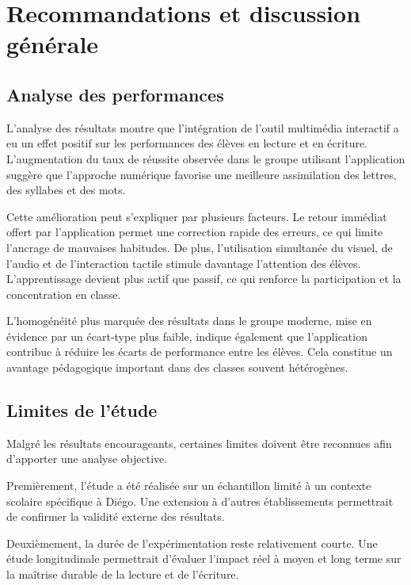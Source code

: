 \documentclass[a4paper,oneside,12pt]{book}
\begin{document}
  








\chapter{Recommandations et discussion générale}\label{chap2}








\section{Analyse des performances}
L'analyse des résultats montre que l'intégration de l'outil multimédia interactif a eu un effet positif sur les performances des élèves en lecture et en écriture. L'augmentation du taux de réussite observée dans le groupe utilisant l'application suggère que l'approche numérique favorise une meilleure assimilation des lettres, des syllabes et des mots.

Cette amélioration peut s'expliquer par plusieurs facteurs. Le retour immédiat offert par l'application permet une correction rapide des erreurs, ce qui limite l'ancrage de mauvaises habitudes. De plus, l'utilisation simultanée du visuel, de l'audio et de l'interaction tactile stimule davantage l'attention des élèves. L'apprentissage devient plus actif que passif, ce qui renforce la participation et la concentration en classe.

L'homogénéité plus marquée des résultats dans le groupe moderne, mise en évidence par un écart-type plus faible, indique également que l'application contribue à réduire les écarts de performance entre les élèves. Cela constitue un avantage pédagogique important dans des classes souvent hétérogènes.

\section{ Limites de l'étude}
Malgré les résultats encourageants, certaines limites doivent être reconnues afin d'apporter une analyse objective.

Premièrement, l'étude a été réalisée sur un échantillon limité à un contexte scolaire spécifique à Diégo. Une extension à d'autres établissements permettrait de confirmer la validité externe des résultats.

Deuxièmement, la durée de l'expérimentation reste relativement courte. Une étude longitudinale permettrait d'évaluer l'impact réel à moyen et long terme sur la maîtrise durable de la lecture et de l'écriture.
\end{document}
